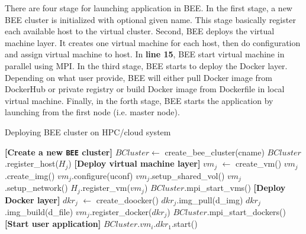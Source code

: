 There are four stage for launching application in BEE. In the first stage, a new BEE cluster is initialized with optional given name. This stage basically register each available host to the virtual cluster. Second, BEE deploys the virtual machine layer. It creates one virtual machine for each host, then do configuration and assign virtual machine to host. In \textbf{line 15}, BEE start virtual machine in parallel using MPI. In the third stage, BEE starts to deploy the Docker layer. Depending on what user provide, BEE will either pull Docker image from DockerHub or private registry or build Docker image from Dockerfile in local virtual machine. Finally, in the forth stage, BEE starts the application by launching from the first node (i.e. master node).


\begin{algorithm}
\caption{Deploying BEE cluster on HPC/cloud system}
\label{bee-launch}
\begin{algorithmic}[1]
\STATE \textbf{[Create a new \texttt{BEE} cluster]}
\STATE $BCluster \leftarrow$ create\_bee\_cluster(cname)
	\STATE $BCluster$.register\_host($H_j$)
\ENDFOR
\STATE \textbf{[Deploy virtual machine layer]}
	\STATE $vm_j$ $\leftarrow$ create\_vm()
	\STATE $vm_j$.create\_img() 
	\STATE $vm_j$.configure(uconf) 
	\STATE $vm_j$.setup\_shared\_vol()
	\STATE $vm_j$.setup\_network()
	\STATE $H_j$.register\_vm($vm_j$)
\ENDFOR
\STATE $BCluster$.mpi\_start\_vms()
\STATE \textbf{[Deploy Docker layer]}
	\STATE $dkr_j$ $\leftarrow$ create\_doocker()
		\STATE $dkr_j$.img\_pull(d\_img)
	\ELSE
		\STATE $dkr_j$.img\_build(d\_file)
    \ENDIF
	$vm_j$.register\_docker($dkr_j$)
\ENDFOR
\STATE $BCluster$.mpi\_start\_dockers()
\STATE \textbf{[Start user application]}
\STATE $BCluster$.$vm_i$.$dkr_1$.start()

\end{algorithmic}
\end{algorithm}


